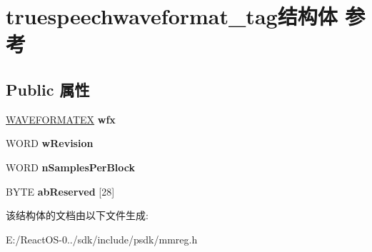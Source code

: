 \hypertarget{structtruespeechwaveformat__tag}{}\section{truespeechwaveformat\+\_\+tag结构体 参考}
\label{structtruespeechwaveformat__tag}
\subsection*{Public 属性}
\begin{DoxyCompactItemize}
\item 
\mbox{\label{structtruespeechwaveformat__tag_aa7fb023a94eced7b75fe98f9215e22f3}} 
\hyperlink{struct_w_a_v_e_f_o_r_m_a_t_e_x}{W\+A\+V\+E\+F\+O\+R\+M\+A\+T\+EX} {\bfseries wfx}
\item 
\mbox{\label{structtruespeechwaveformat__tag_ac53b0874ff645c04c4dfa8257f11f5cf}} 
W\+O\+RD {\bfseries w\+Revision}
\item 
\mbox{\label{structtruespeechwaveformat__tag_a6cdaa1b825c5e9f2d3ff18d52feb9c84}} 
W\+O\+RD {\bfseries n\+Samples\+Per\+Block}
\item 
\mbox{\label{structtruespeechwaveformat__tag_a24fc47108ab231e5b60167412719b06e}} 
B\+Y\+TE {\bfseries ab\+Reserved} \mbox{[}28\mbox{]}
\end{DoxyCompactItemize}


该结构体的文档由以下文件生成\+:\begin{DoxyCompactItemize}
\item 
E\+:/\+React\+O\+S-\/0../sdk/include/psdk/mmreg.\+h\end{DoxyCompactItemize}
